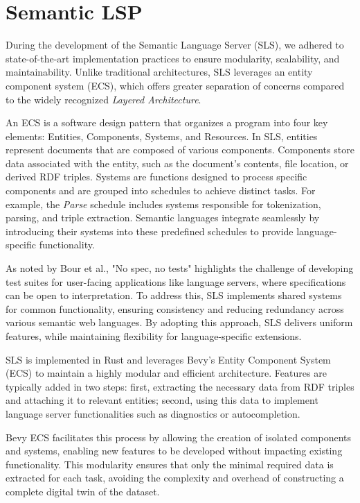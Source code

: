 \section{Semantic LSP}%
\label{sec:semantic_lsp}

During the development of the Semantic Language Server (SLS), we adhered to state-of-the-art implementation practices to ensure modularity, scalability, and maintainability\cite{10.1145/3550355.3552452,10.1145/3563834.3567537,10.1145/3550355.3552452,Bour_2018}.
Unlike traditional architectures, SLS leverages an entity component system (ECS), which offers greater separation of concerns compared to the widely recognized \textit{Layered Architecture}\cite{10.1145/3550355.3552452}.

An ECS is a software design pattern that organizes a program into four key elements: Entities, Components, Systems, and Resources. 
In SLS, entities represent documents that are composed of various components. 
Components store data associated with the entity, such as the document's contents, file location, or derived RDF triples. 
Systems are functions designed to process specific components and are grouped into schedules to achieve distinct tasks. 
For example, the \textit{Parse} schedule includes systems responsible for tokenization, parsing, and triple extraction.
Semantic languages integrate seamlessly by introducing their systems into these predefined schedules to provide language-specific functionality.

As noted by Bour et al., "No spec, no tests" highlights the challenge of developing test suites for user-facing applications like language servers, where specifications can be open to interpretation\cite{Bour_2018}. 
To address this, SLS implements shared systems for common functionality, ensuring consistency and reducing redundancy across various semantic web languages.
By adopting this approach, SLS delivers uniform features, while maintaining flexibility for language-specific extensions.

SLS is implemented in Rust and leverages Bevy’s Entity Component System (ECS) to maintain a highly modular and efficient architecture.
Features are typically added in two steps:
  first, extracting the necessary data from RDF triples and attaching it to relevant entities; 
  second, using this data to implement language server functionalities such as diagnostics or autocompletion.

Bevy ECS facilitates this process by allowing the creation of isolated components and systems, enabling new features to be developed without impacting existing functionality.
This modularity ensures that only the minimal required data is extracted for each task, avoiding the complexity and overhead of constructing a complete digital twin of the dataset.


